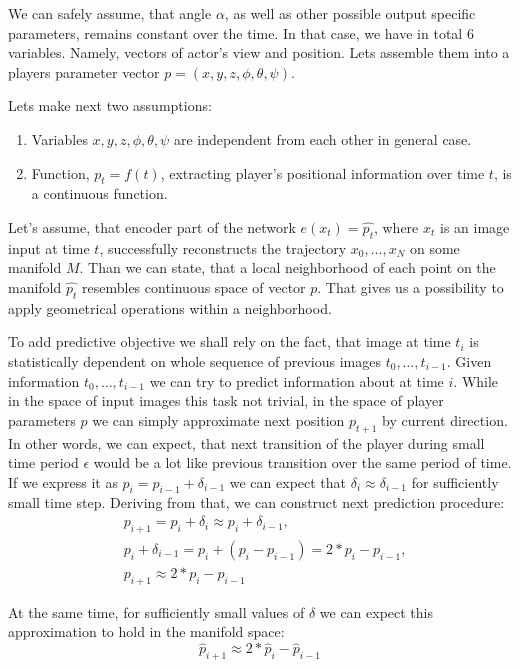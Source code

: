We can safely assume, that angle $\alpha$, as well as other possible output specific parameters, remains constant over the time.
In that case, we have in total 6 variables.
Namely, vectors of actor's view and position.
Lets assemble them into a players parameter vector $p=(x, y, z, \phi, \theta, \psi)$.

Lets make next two assumptions:
\begin{enumerate}
  \item Variables $x, y, z, \phi, \theta, \psi$ are independent from each other in general case.
  \item Function, $p_t=f(t)$, extracting player's positional information over time $t$, is a continuous function.
\end{enumerate}

Let's assume, that encoder part of the network $e(x_t)= \hat{p_t}$, where $x_t$ is an image input at time $t$, successfully reconstructs the trajectory ${x_0, \ldots, x_N}$ on some manifold $M$.
Than we can state, that a local neighborhood of each point on the manifold $\hat{p_t}$ resembles continuous space of vector $p$. That gives us a possibility to apply geometrical operations within a neighborhood.

To add predictive objective we shall rely on the fact, that image at time $t_i$ is statistically dependent on whole sequence of previous images ${t_0, \ldots, t_{i-1}}$.
Given information ${t_0, \ldots, t_{i-1}}$ we can try to predict information about at time $i$.
While in the space of input images this task not trivial, in the space of player parameters $p$ we can simply approximate next position $p_{t+1}$ by current direction.
In other words, we can expect, that next transition of the player during small time period $\epsilon$ would be a lot like previous transition over the same period of time.
If we express it as $p_i = p_{i-1} + \delta_{i-1}$ we can expect that $\delta_i \approx \delta_{i-1}$ for sufficiently small time step. Deriving from that, we can construct next prediction procedure:
\begin{equation}
  \begin{aligned}
    &p_{i+1} = p_i + \delta_i \approx p_i + \delta_{i-1},\\
    &p_i + \delta_{i-1} = p_i + (p_i - p_{i-1}) = 2*p_i - p_{i-1}, \\
    &p_{i+1} \approx 2*p_i - p_{i-1}
  \end{aligned}
\end{equation}

At the same time, for sufficiently small values of $\delta$ we can expect this approximation to hold in the manifold space:
\begin{equation}
  \hat{p}_{i+1} \approx 2*\hat{p}_i - \hat{p}_{i-1}
\end{equation}

